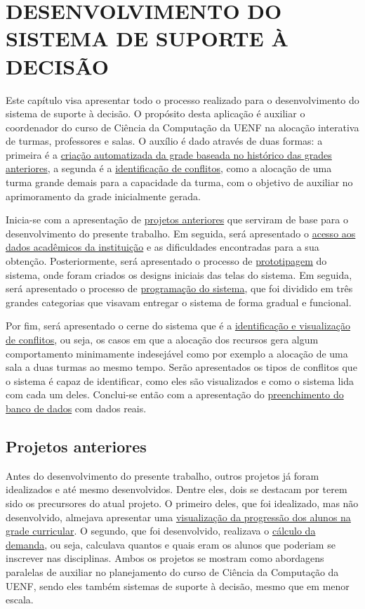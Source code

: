 \chapter{DESENVOLVIMENTO DO SISTEMA DE SUPORTE À DECISÃO} \label{chap:desenvolvimento} %

Este capítulo visa apresentar todo o processo realizado para o desenvolvimento do sistema de suporte à decisão. O propósito desta aplicação é auxiliar o coordenador do curso de Ciência da Computação da UENF na alocação interativa de turmas, professores e salas. O auxílio é dado através de duas formas: a primeira é a \hyperref[par:Solução inicial]{criação automatizada da grade baseada no histórico das grades anteriores}, a segunda é a \hyperref[sec:conflitos]{identificação de conflitos}, como a alocação de uma turma grande demais para a capacidade da turma, com o objetivo de auxiliar no aprimoramento da grade inicialmente gerada.

Inicia-se com a apresentação de \hyperref[sec:projetos]{projetos anteriores} que serviram de base para o desenvolvimento do presente trabalho. Em seguida, será apresentado o \hyperref[sec:LGPD]{acesso aos dados acadêmicos da instituição} e as dificuldades encontradas para a sua obtenção. Posteriormente, será apresentado o processo de \hyperref[sec:prototipagem]{prototipagem} do sistema, onde foram criados os designs iniciais das telas do sistema. Em seguida, será apresentado o processo de \hyperref[sec:programação]{programação do sistema}, que foi dividido em três grandes categorias que visavam entregar o sistema de forma gradual e funcional.

Por fim, será apresentado o cerne do sistema que é a \hyperref[sec:conflitos]{identificação e visualização de conflitos}, ou seja, os casos em que a alocação dos recursos gera algum comportamento minimamente indesejável como por exemplo a alocação de uma sala a duas turmas ao mesmo tempo. Serão apresentados os tipos de conflitos que o sistema é capaz de identificar, como eles são visualizados e como o sistema lida com cada um deles. Conclui-se então com a apresentação do \hyperref[sec:preenchimento]{preenchimento do banco de dados} com dados reais.

\section{Projetos anteriores} \label{sec:projetos} %

Antes do desenvolvimento do presente trabalho, outros projetos já foram idealizados e até mesmo desenvolvidos. Dentre eles, dois se destacam por terem sido os precursores do atual projeto. O primeiro deles, que foi idealizado, mas não desenvolvido, almejava apresentar uma \hyperref[subsec:andamento]{visualização da progressão dos alunos na grade curricular}. O segundo, que foi desenvolvido, realizava o \hyperref[subsec:demanda]{cálculo da demanda}, ou seja, calculava quantos e quais eram os alunos que poderiam se inscrever nas disciplinas. Ambos os projetos se mostram como abordagens paralelas de auxiliar no planejamento do curso de Ciência da Computação da UENF, sendo eles também sistemas de suporte à decisão, mesmo que em menor escala.

